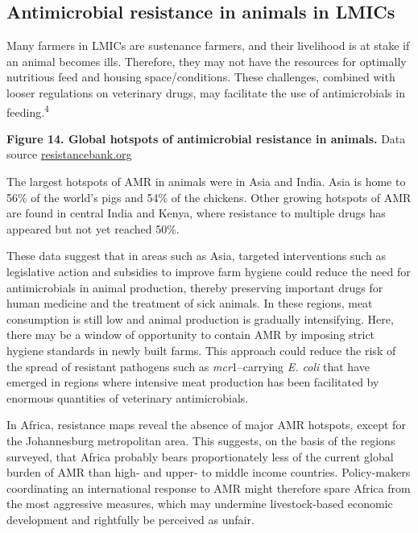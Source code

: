 \documentclass[
]{book}
\begin{document}
\hypertarget{antimicrobial-resistance-in-animals-in-lmics}{%
\subsection*{Antimicrobial resistance in animals in LMICs}\label{antimicrobial-resistance-in-animals-in-lmics}}

Many farmers in LMICs are sustenance farmers, and their livelihood is at stake if an animal becomes ills. Therefore, they may not have the resources for optimally nutritious feed and housing space/conditions. These challenges, combined with looser regulations on veterinary drugs, may facilitate the use of antimicrobials in feeding.\textsuperscript{4}

\textbf{Figure 14. Global hotspots of antimicrobial resistance in animals.} Data source \href{https://resistancebank.org/}{resistancebank.org}

The largest hotspots of AMR in animals were in Asia and India. Asia is home to 56\% of the world's pigs and 54\% of the chickens. Other growing hotspots of AMR are found in central India and Kenya, where resistance to multiple drugs has appeared but not yet reached 50\%.

These data suggest that in areas such as Asia, targeted interventions such as legislative action and subsidies to improve farm hygiene could reduce the need for antimicrobials in animal production, thereby preserving important drugs for human medicine and the treatment of sick animals. In these regions, meat consumption is still low and animal production is gradually intensifying. Here, there may be a window of opportunity to contain AMR by imposing strict hygiene standards in newly built farms. This approach could reduce the risk of the spread of resistant pathogens such as \emph{mcr}1--carrying \emph{E. coli} that have emerged in regions where intensive meat production has been facilitated by enormous quantities of veterinary antimicrobials.

In Africa, resistance maps reveal the absence of major AMR hotspots, except for the Johannesburg metropolitan area. This suggests, on the basis of the regions surveyed, that Africa probably bears proportionately less of the current global burden of AMR than high- and upper- to middle income countries. Policy-makers coordinating an international response to AMR might therefore spare Africa from the most aggressive measures, which may undermine livestock-based economic development and rightfully be perceived as unfair.
\end{document}
